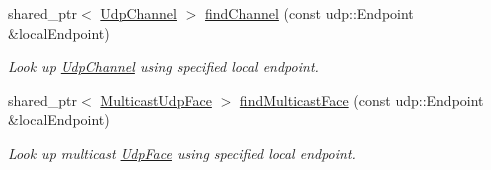 \begin{DoxyCompactItemize}
\item 
shared\+\_\+ptr$<$ \hyperlink{classnfd_1_1UdpChannel}{Udp\+Channel} $>$ \hyperlink{classnfd_1_1UdpFactory_a29bd47efc6abce7ad40730bbcb0af715}{find\+Channel} (const udp\+::\+Endpoint \&local\+Endpoint)
\begin{DoxyCompactList}\small\item\em Look up \hyperlink{classnfd_1_1UdpChannel}{Udp\+Channel} using specified local endpoint. \end{DoxyCompactList}\item 
shared\+\_\+ptr$<$ \hyperlink{classnfd_1_1MulticastUdpFace}{Multicast\+Udp\+Face} $>$ \hyperlink{classnfd_1_1UdpFactory_ab9efc0d4b0ada20dea9b2792d535938a}{find\+Multicast\+Face} (const udp\+::\+Endpoint \&local\+Endpoint)
\begin{DoxyCompactList}\small\item\em Look up multicast \hyperlink{classnfd_1_1UdpFace}{Udp\+Face} using specified local endpoint. \end{DoxyCompactList}\end{DoxyCompactItemize}
